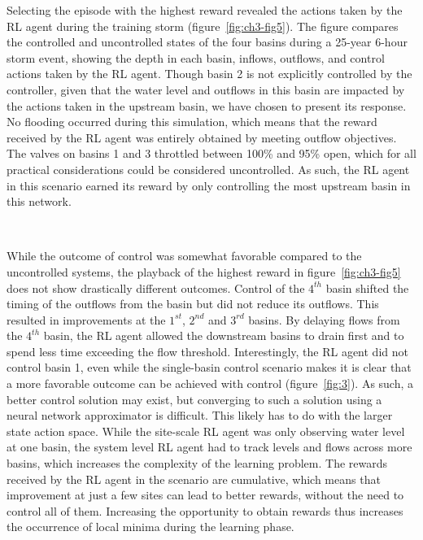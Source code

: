 Selecting the episode with the highest reward revealed the actions taken by the RL agent during the training storm (figure~\ref{fig:ch3-fig5}).
The figure compares the controlled and uncontrolled states of the four basins during a 25-year 6-hour storm event, showing the depth in each basin, inflows, outflows, and control actions taken by the RL agent.
Though basin 2 is not explicitly controlled by the controller, given that the water level and outflows in this basin are impacted by the actions taken in the upstream basin, we have chosen to present its response.
No flooding occurred during this simulation, which means that the reward received by the RL agent was entirely obtained by meeting outflow objectives.
The valves on basins 1 and 3 throttled between 100\% and 95\% open, which for all practical considerations could be considered uncontrolled.
As such, the RL agent in this scenario earned its reward by only controlling the most upstream basin in this network.

\

While the outcome of control was somewhat favorable compared to the uncontrolled systems, the playback of the highest reward in figure~\ref{fig:ch3-fig5} does not show drastically different outcomes.
Control of the $4^{th}$ basin shifted the timing of the outflows from the basin but did not reduce its outflows.
This resulted in improvements at the $1^{st}$, $2^{nd}$ and $3^{rd}$ basins.
By delaying flows from the $4^{th}$ basin, the RL agent allowed the downstream basins to drain first and to spend less time exceeding the flow threshold.
Interestingly, the RL agent did not control basin 1, even while the single-basin control scenario makes it is clear that a more favorable outcome can be achieved with control (figure~\ref{fig:3}).
As such, a better control solution may exist, but converging to such a solution using a neural network approximator is difficult.
This likely has to do with the larger state action space.
While the site-scale RL agent was only observing water level at one basin, the system level RL agent had to track levels and flows across more basins, which increases the complexity of the learning problem.
The rewards received by the RL agent in the scenario are cumulative, which means that improvement at just a few sites can lead to better rewards, without the need to control all of them.
Increasing the opportunity to obtain rewards thus increases the occurrence of local minima during the learning phase.

\

